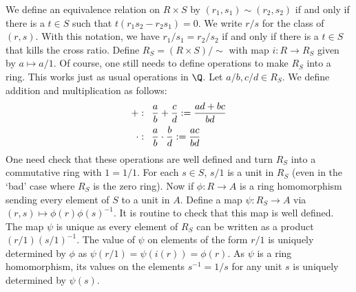 We define an equivalence relation on $R \times S$ by $(r_1,s_1) \sim (r_2,s_2)$ if and only if there is a $t \in S$ such that $t(r_1s_2-r_2s_1)=0$. We write $r/s$ for the class of $(r,s)$. With this notation, we have $r_1/s_1=r_2/s_2$ if and only if there is a $t \in S$ that kills the cross ratio. Define $R_S= (R \times S)/ \sim$ with map $i: R \to R_S$ given by $a \mapsto a/1$. Of course, one still needs to define operations to make $R_S$ into a ring. This works just as usual operations in $\Q$. Let $a/b, c/d \in R_S$. We define addition and multiplication as follows:
	\[
	\begin{split}
	+&: \enskip \dfrac{a}{b} + \dfrac{c}{d}:= \dfrac{ad+bc}{bd} \\
	\cdot&: \enskip \dfrac{a}{b} \cdot \dfrac{b}{d}:= \dfrac{ac}{bd}
	\end{split}
	\]
One need check that these operations are well defined and turn $R_S$ into a commutative ring with $1=1/1$. For each $s \in S$, $s/1$ is a unit in $R_S$ (even in the `bad' case where $R_S$ is the zero ring). Now if $\phi: R \to A$ is a ring homomorphism sending every element of $S$ to a unit in $A$. Define a map $\psi: R_S \to A$ via $(r,s) \mapsto \phi(r)\phi(s)^{-1}$. It is routine to check that this map is well defined. The map $\psi$ is unique as every element of $R_S$ can be written as a product $(r/1)(s/1)^{-1}$. The value of $\psi$ on elements of the form $r/1$ is uniquely determined by $\phi$ as $\psi(r/1)=\psi(i(r))=\phi(r)$. As $\psi$ is a ring homomorphism, its values on the elements $s^{-1}=1/s$ for any unit $s$ is uniquely determined by $\psi(s)$. 


